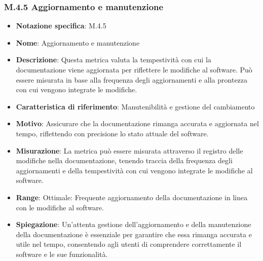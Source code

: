 \subsubsection{M.4.5 Aggiornamento e manutenzione}
\begin{itemize}
    \item \textbf{Notazione specifica}: M.4.5
    \item \textbf{Nome}: Aggiornamento e manutenzione
    \item \textbf{Descrizione}: Questa metrica valuta la tempestività con cui la documentazione viene aggiornata per riflettere le modifiche al software. Può essere misurata in base alla frequenza degli aggiornamenti e alla prontezza con cui vengono integrate le modifiche.
    \item \textbf{Caratteristica di riferimento}: Manutenibilità e gestione del cambiamento
    \item \textbf{Motivo}: Assicurare che la documentazione rimanga accurata e aggiornata nel tempo, riflettendo con precisione lo stato attuale del software.
    \item \textbf{Misurazione}: La metrica può essere misurata attraverso il registro delle modifiche nella documentazione, tenendo traccia della frequenza degli aggiornamenti e della tempestività con cui vengono integrate le modifiche al software.
    \item \textbf{Range}: Ottimale: Frequente aggiornamento della documentazione in linea con le modifiche al software.
    \item \textbf{Spiegazione}: Un'attenta gestione dell'aggiornamento e della manutenzione della documentazione è essenziale per garantire che essa rimanga accurata e utile nel tempo, consentendo agli utenti di comprendere correttamente il software e le sue funzionalità.
\end{itemize}
